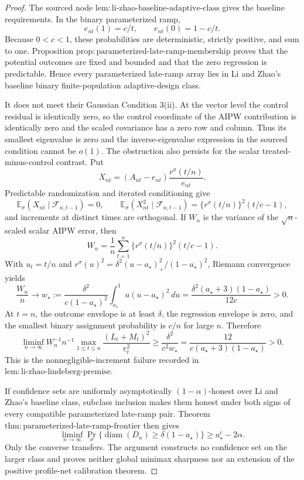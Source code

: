 \documentclass{article}
\begin{document}
\begin{proof}
The sourced node \(\mathrm{lem:li\mbox{-}zhao\mbox{-}baseline\mbox{-}adaptive\mbox{-}class}\) gives the baseline requirements. In the binary parameterized ramp,
\[
 e_{nt}(1)=c/t,
 \qquad
 e_{nt}(0)=1-c/t.
\]
Because \(0<c<1\), these probabilities are deterministic, strictly positive, and sum to one. Proposition \(\mathrm{prop:parameterized\mbox{-}late\mbox{-}ramp\mbox{-}membership}\) proves that the potential outcomes are fixed and bounded and that the zero regression is predictable. Hence every parameterized late-ramp array lies in Li and Zhao's baseline binary finite-population adaptive-design class.

It does not meet their Gaussian Condition 3(ii). At the vector level the control residual is identically zero, so the control coordinate of the AIPW contribution is identically zero and the scaled covariance has a zero row and column. Thus its smallest eigenvalue is zero and the inverse-eigenvalue expression in the sourced condition cannot be \(o(1)\). The obstruction also persists for the scalar treated-minus-control contrast. Put
\[
 X_{nt}=(A_{nt}-e_{nt})\frac{r^\sigma(t/n)}{e_{nt}}.
\]
Predictable randomization and iterated conditioning give
\[
 \mathbb E_\sigma(X_{nt}\mid\mathcal F_{n,t-1})=0,
 \qquad
 \mathbb E_\sigma(X_{nt}^2\mid\mathcal F_{n,t-1})
 =\{r^\sigma(t/n)\}^2(t/c-1),
\]
and increments at distinct times are orthogonal. If \(W_n\) is the variance of the \(\sqrt n\)-scaled scalar AIPW error, then
\[
 W_n=\frac1n\sum_{t=1}^n
 \{r^\sigma(t/n)\}^2(t/c-1).
\]
With \(u_t=t/n\) and
\(r^\sigma(u)^2=\delta^2(u-a_\star)_+^2/(1-a_\star)^2\), Riemann convergence yields
\[
 \frac{W_n}{n}\longrightarrow
 w_\star
 :=\frac{\delta^2}{c(1-a_\star)^2}
   \int_{a_\star}^1u(u-a_\star)^2\,du
 =\frac{\delta^2(a_\star+3)(1-a_\star)}{12c}>0.
\]
At \(t=n\), the outcome envelope is at least \(\delta\), the regression envelope is zero, and the smallest binary assignment probability is \(c/n\) for large \(n\). Therefore
\[
 \liminf_{n\to\infty}
 W_n^{-1}n^{-1}
 \max_{1\le t\le n}
 \frac{(L_t+M_t)^2}{\underline e_t^2}
 \ge\frac{\delta^2}{c^2w_\star}
 =\frac{12}{c(a_\star+3)(1-a_\star)}>0.
\]
This is the nonnegligible-increment failure recorded in \(\mathrm{lem:li\mbox{-}zhao\mbox{-}lindeberg\mbox{-}premise}\).

If confidence sets are uniformly asymptotically \((1-\alpha)\)-honest over Li and Zhao's baseline class, subclass inclusion makes them honest under both signs of every compatible parameterized late-ramp pair. Theorem \(\mathrm{thm:parameterized\mbox{-}late\mbox{-}ramp\mbox{-}frontier}\) then gives
\[
 \liminf_{n\to\infty}
 \Pr_\sigma\{\operatorname{diam}(D_n)
                 \ge\delta(1-a_\star)\}
 \ge a_\star^c-2\alpha.
\]
Only the converse transfers. The argument constructs no confidence set on the larger class and proves neither global minimax sharpness nor an extension of the positive profile-net calibration theorem.
\end{proof}
\end{document}
